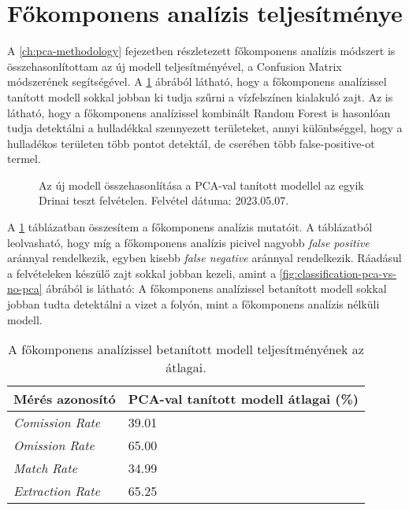 \section{Főkomponens analízis teljesítménye}
\label{ch:pca-performance}

A \ref{ch:pca-methodology} fejezetben részletezett főkomponens analízis módszert is összehasonlítottam az új modell teljesítményével, a Confusion Matrix módszerének segítségével. A \ref{fig:pca-vs-no-pca} ábrából látható, hogy a főkomponens analízissel tanított modell sokkal jobban ki tudja szűrni a vízfelszínen kialakuló zajt. Az is látható, hogy a főkomponens analízissel kombinált Random Forest is hasonlóan tudja detektálni a hulladékkal szennyezett területeket, annyi különbséggel, hogy a hulladékos területen több pontot detektál, de cserében több false-positive-ot termel.

\begin{figure}[H]
	\centering
	\hspace{5pt}
	\hspace{5pt}
	\caption{Az új modell összehasonlítása a PCA-val tanított modellel az egyik Drinai teszt felvételen. Felvétel dátuma: 2023.05.07.}
	\label{fig:pca-vs-no-pca}
\end{figure}

A \ref{tab:pca-vs-no-pca} táblázatban összesítem a főkomponens analízis mutatóit. A táblázatból leolvasható, hogy míg a főkomponens analízis picivel nagyobb \textit{false positive} aránnyal rendelkezik, egyben kisebb \textit{false negative} aránnyal rendelkezik. Ráadásul a felvételeken készülő zajt sokkal jobban kezeli, amint a \ref{fig:classification-pca-vs-no-pca} ábrából is látható: A főkomponens analízissel betanított modell sokkal jobban tudta detektálni a vizet a folyón, mint a főkomponens analízis nélküli modell.

\begin{table}[H]
	\centering
	\begin{tabular}{ | p{} | p{} | }
		\hline
		\textbf{Mérés azonosító} & \textbf{PCA-val tanított modell átlagai (\%)} \\
		\hline \hline
		\emph{Comission Rate} & 39.01 \\
		\hline
		\emph{Omission Rate} & 65.00 \\
		\hline
		\emph{Match Rate} & 34.99  \\
		\hline
        \emph{Extraction Rate} & 65.25 \\
		\hline
	\end{tabular}
	\caption{A főkomponens analízissel betanított modell teljesítményének az átlagai.}
	\label{tab:pca-vs-no-pca}
\end{table}


